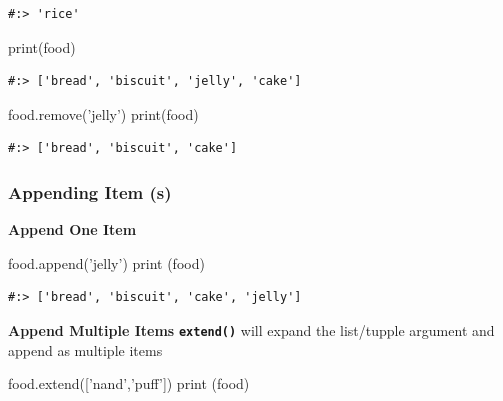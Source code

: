 \documentclass[
]{book}
\newenvironment{Shaded}{\begin{snugshade}}{\end{snugshade}}
\newcommand{\BuiltInTok}[1]{#1}
\newcommand{\NormalTok}[1]{#1}
\newcommand{\StringTok}[1]{\textcolor[rgb]{0.5,0.5,0.5}{#1}}
\begin{document}
\begin{verbatim}
#:> 'rice'
\end{verbatim}

\begin{Shaded}
\begin{Highlighting}[]
\BuiltInTok{print}\NormalTok{(food)}
\end{Highlighting}
\end{Shaded}

\begin{verbatim}
#:> ['bread', 'biscuit', 'jelly', 'cake']
\end{verbatim}

\begin{Shaded}
\begin{Highlighting}[]
\NormalTok{food.remove(}\StringTok{'jelly'}\NormalTok{)}
\BuiltInTok{print}\NormalTok{(food)}
\end{Highlighting}
\end{Shaded}

\begin{verbatim}
#:> ['bread', 'biscuit', 'cake']
\end{verbatim}

\hypertarget{appending-item-s}{%
\subsubsection{Appending Item (s)}\label{appending-item-s}}

\textbf{Append One Item}

\begin{Shaded}
\begin{Highlighting}[]
\NormalTok{food.append(}\StringTok{'jelly'}\NormalTok{)}
\BuiltInTok{print}\NormalTok{ (food)}
\end{Highlighting}
\end{Shaded}

\begin{verbatim}
#:> ['bread', 'biscuit', 'cake', 'jelly']
\end{verbatim}

\textbf{Append Multiple Items} \textbf{\texttt{extend()}} will expand the list/tupple argument and append as multiple items

\begin{Shaded}
\begin{Highlighting}[]
\NormalTok{food.extend([}\StringTok{'nand'}\NormalTok{,}\StringTok{'puff'}\NormalTok{])}
\BuiltInTok{print}\NormalTok{ (food)}
\end{Highlighting}
\end{Shaded}
\end{document}
